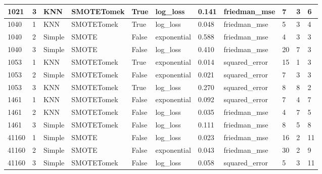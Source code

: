 \documentclass[11pt]{article}
\begin{document}
\begin{table}
\begin{tabular}{lllllllllll}
1021 & 3 & KNN & SMOTETomek & True & log\_loss & 0.141 & friedman\_mse & 7 & 3 & 6 \\
\midrule
1040 & 1 & KNN & SMOTETomek & True & log\_loss & 0.048 & friedman\_mse & 5 & 3 & 4 \\
1040 & 2 & Simple & SMOTE & False & exponential & 0.588 & friedman\_mse & 4 & 3 & 3 \\
1040 & 3 & Simple & SMOTE & False & log\_loss & 0.410 & friedman\_mse & 20 & 7 & 3 \\
\midrule
1053 & 1 & KNN & SMOTETomek & True & exponential & 0.014 & squared\_error & 15 & 1 & 3 \\
1053 & 2 & Simple & SMOTETomek & False & exponential & 0.021 & squared\_error & 7 & 3 & 3 \\
1053 & 3 & KNN & SMOTETomek & True & log\_loss & 0.270 & squared\_error & 8 & 8 & 2 \\
\midrule
1461 & 1 & KNN & SMOTETomek & False & exponential & 0.092 & squared\_error & 7 & 4 & 7 \\
1461 & 2 & KNN & SMOTETomek & False & log\_loss & 0.035 & friedman\_mse & 4 & 7 & 5 \\
1461 & 3 & Simple & SMOTETomek & False & log\_loss & 0.111 & friedman\_mse & 8 & 5 & 8 \\
\midrule
41160 & 1 & Simple & SMOTE & False & log\_loss & 0.023 & friedman\_mse & 16 & 2 & 11 \\
41160 & 2 & Simple & SMOTE & False & exponential & 0.043 & friedman\_mse & 30 & 2 & 9 \\
41160 & 3 & Simple & SMOTETomek & False & log\_loss & 0.058 & squared\_error & 5 & 3 & 11 \\
\bottomrule
\end{tabular}
\end{table}
\end{document}
